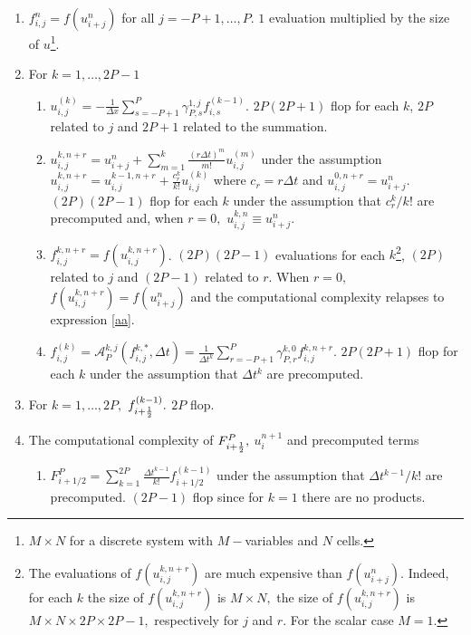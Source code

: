 \begin{enumerate}
    \item \label{aa} $f_{i,j}^n = f(u_{i+j}^n)$ for all $j=-P+1,\ldots,P$. $1$ evaluation multiplied by the size of $u$\footnote{$M\times N$ for a discrete system with $M-$variables and $N$ cells.}.
    
    \item \label{c2} For $k=1,\ldots,2P-1$
    \begin{enumerate}
        \item \label{c2.a} $u_{i,j}^{(k)} = -\frac{1}{\Delta x}\sum_{s = -P+1}^{P}\gamma_{P,s}^{1,j}f_{i,s}^{(k-1)}.$ \;
        $2P(2P+1)$ flop for each $k$, $2P$ related to $j$ and $2P+1$ related to the summation.
        
        \item \label{c2.b} $ u_{i,j}^{k,n+r} = u^n_{i+j} +\sum_{m=1}^k\frac{(r\Delta t)^m}{m!} u^{(m)}_{i,j} $ under the assumption $ u_{i,j}^{k,n+r} = u^{k-1,n+r}_{i,j} +\frac{c_r^k}{k!} u^{(k)}_{i,j}$ where  $c_r=r\Delta t$ and $u^{0,n+r}_{i,j} = u^{n}_{i+j}.$ \; $(2P)(2P-1)$ flop for each $k$ under the assumption that $c_r^k/k!$ are precomputed and, when $r=0,$ $u_{i,j}^{k,n} \equiv u_{i+j}^n$.
        
        \item \label{c2.c} $f_{i,j}^{k,n+r}=f(u_{i,j}^{k,n+r})$. \; $(2P)(2P - 1)$ evaluations for each $k$\footnote{The evaluations of $f(u_{i,j}^{k,n+r})$ are much expensive than $f(u_{i+j}^n).$ Indeed, for each $k$ the size of $f(u_{i,j}^{k,n+r})$ is $M\times N,$ the size of $f(u_{i,j}^{k,n+r})$ is $M\times N \times 2P \times 2P-1,$ respectively for $j$ and $r$. For the scalar case $M=1.$}, $(2P)$ related to $j$ and $(2P-1)$ related to $r.$ When $r = 0,$ $f(u_{i,j}^{k,n+r}) = f(u_{i+j}^{n})$ and the computational complexity relapses to expression \eqref{aa}. 
        
        \item \label{c2.d} $f^{(k)}_{i,j} = \mathcal{A}^{k,j}_{P}\left(f_{i,j}^{k,*},\Delta t\right) = \frac{1}{\Delta t^k}\sum_{r=-P+1}^P\gamma_{P,r}^{k,0}f_{i,j}^{k,n+r} .$ \;
        $2P(2P+1)$ flop for each $k$ under the assumption that $\Delta t^k$ are precomputed.
    \end{enumerate}
    
    \item For $k=1,\ldots,2P,$ $f_{i+\frac{1}{2}}^{(k-1)}.$ \; $2P$ flop.
    
    \item The computational complexity of $F^P_{i+\frac{1}{2}},$  $u_i^{n+1}$ and precomputed terms 
    \begin{enumerate}
        \item $ F^P_{i+1/2} = \sum_{k=1}^{2P}\frac{\Delta t^{k-1}}{k!}f_{i+1/2}^{(k-1)} $ under the assumption that $\Delta t^{k-1}/k!$ are precomputed. \; $(2P-1)$ flop since for $k=1$ there are no products.
        

\end{enumerate}
\end{enumerate}
